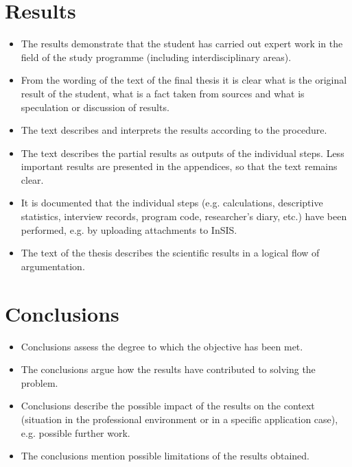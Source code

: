\section*{Results}
\begin{itemize}
\item \vspace*{-2ex}The results demonstrate that the student has carried out expert work in the field of the study programme (including interdisciplinary areas).
\item From the wording of the text of the final thesis it is clear what is the original result of the student, what is a fact taken from sources and what is speculation or discussion of results.
\item The text describes and interprets the results according to the procedure.
\item The text describes the partial results as outputs of the individual steps. Less important results are presented in the appendices, so that the text remains clear.
\item It is documented that the individual steps (e.g. calculations, descriptive statistics, interview records, program code, researcher's diary, etc.) have been performed, e.g. by uploading attachments to InSIS.
\item The text of the thesis describes the scientific results in a logical flow of argumentation. 
\end{itemize}

\section*{Conclusions}
\begin{itemize}
\item \vspace*{-2ex}Conclusions assess the degree to which the objective has been met.
\item The conclusions argue how the results have contributed to solving the problem.
\item Conclusions describe the possible impact of the results on the context (situation in the professional environment or in a specific application case), e.g. possible further work.
\item The conclusions mention possible limitations of the results obtained.
\end{itemize}

